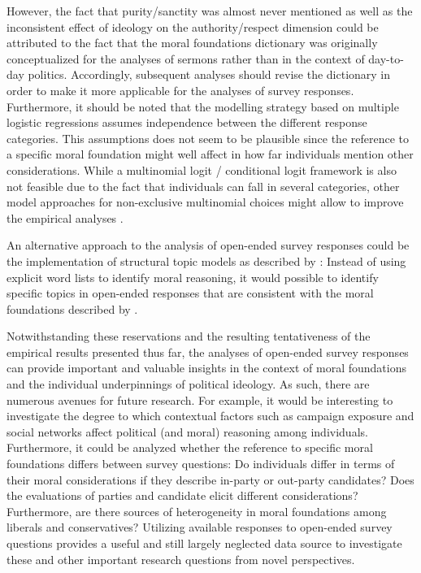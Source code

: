 \documentclass[12pt]{paper}
\begin{document}
However, the fact that purity/sanctity was almost never mentioned as well as the inconsistent effect of ideology on the authority/respect dimension could be attributed to the fact that the moral foundations dictionary was originally conceptualized for the analyses of sermons rather than in the context of day-to-day politics. Accordingly, subsequent analyses should revise the dictionary in order to make it more applicable for the analyses of survey responses. Furthermore, it should be noted that the modelling strategy based on multiple logistic regressions assumes independence between the different response categories. This assumptions does not seem to be plausible since the reference to a specific moral foundation might well affect in how far individuals mention other considerations. While a multinomial logit / conditional logit framework is also not feasible due to the fact that individuals can fall in several categories, other model approaches for non-exclusive multinomial choices might allow to improve the empirical analyses \citep[see for example][]{gilbert2007models}.

An alternative approach to the analysis of open-ended survey responses could be the implementation of structural topic models as described by \citet{roberts2014structural}: Instead of using explicit word lists to identify moral reasoning, it would possible to identify specific topics in open-ended responses that are consistent with the moral foundations described by \citet{haidt2008moral} \citep[see also][]{lin2008joint}.

Notwithstanding these reservations and the resulting tentativeness of the empirical results presented thus far, the analyses of open-ended survey responses can provide important and valuable insights in the context of moral foundations and the individual underpinnings of political ideology. As such, there are numerous avenues for future research. For example, it would be interesting to investigate the degree to which contextual factors such as campaign exposure and social networks affect political (and moral) reasoning among individuals. Furthermore, it could be analyzed whether the reference to specific moral foundations differs between survey questions: Do individuals differ in terms of their moral considerations if they describe in-party or out-party candidates? Does the evaluations of parties and candidate elicit different considerations? Furthermore, are there sources of heterogeneity in moral foundations among liberals and conservatives? Utilizing available responses to open-ended survey questions provides a useful and still largely neglected data source to investigate these and other important research questions from novel perspectives.
\end{document}
